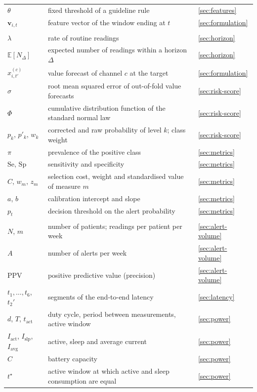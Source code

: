 {\begin{longtable}{@{}>{\raggedright\arraybackslash}p{2.6cm} >{\raggedright\arraybackslash}p{8.6cm} >{\raggedright\arraybackslash}p{2.9cm}@{}}
$\theta$ & fixed threshold of a guideline rule & \cref{sec:features} \\
$\mathbf{v}_{i,t}$ & feature vector of the window ending at $t$ & \cref{sec:formulation} \\
\addlinespace
\multicolumn{3}{@{}l}{\textit{Forecasting and evaluation}} \\
$\lambda$ & rate of routine readings & \cref{sec:horizon} \\
$\mathbb{E}[N_\Delta]$ & expected number of readings within a horizon $\Delta$ & \cref{sec:horizon} \\
$\hat x^{(c)}_{i,t'}$ & value forecast of channel $c$ at the target & \cref{sec:formulation} \\
$\hat\sigma$ & root mean squared error of out-of-fold value forecasts & \cref{sec:risk-score} \\
$\Phi$ & cumulative distribution function of the standard normal law & \cref{sec:risk-score} \\
$p_k$, $p'_k$, $w_k$ & corrected and raw probability of level $k$; class weight & \cref{sec:risk-score} \\
$\pi$ & prevalence of the positive class & \cref{sec:metrics} \\
$\mathrm{Se}$, $\mathrm{Sp}$ & sensitivity and specificity & \cref{sec:metrics} \\
$C$, $w_m$, $z_m$ & selection cost, weight and standardised value of measure $m$ & \cref{sec:metrics} \\
$a$, $b$ & calibration intercept and slope & \cref{sec:metrics} \\
$p_t$ & decision threshold on the alert probability & \cref{sec:metrics} \\
\addlinespace
\multicolumn{3}{@{}l}{\textit{System design}} \\
$N$, $m$ & number of patients; readings per patient per week & \cref{sec:alert-volume} \\
$A$ & number of alerts per week & \cref{sec:alert-volume} \\
$\mathrm{PPV}$ & positive predictive value (precision) & \cref{sec:alert-volume} \\
$t_1, \dots, t_6$, $t_2'$ & segments of the end-to-end latency & \cref{sec:latency} \\
$d$, $T$, $t_{\text{act}}$ & duty cycle, period between measurements, active window & \cref{sec:power} \\
$I_{\text{act}}$, $I_{\text{slp}}$, $I_{\text{avg}}$ & active, sleep and average current & \cref{sec:power} \\
$C$ & battery capacity & \cref{sec:power} \\
$t^\star$ & active window at which active and sleep consumption are equal & \cref{sec:power} \\
\end{longtable}
}

\cleardoublepage
{}
